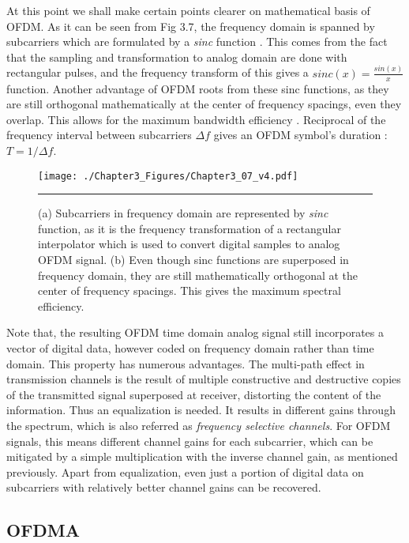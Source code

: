   
At this point we shall make certain points clearer on mathematical basis of OFDM. As it can be seen from Fig 3.7, the frequency domain is spanned by subcarriers which are formulated by a \textit{sinc} function \cite{CarlosOFDM}. This comes from the fact that the sampling and transformation to analog domain are done with rectangular pulses, and the frequency transform of this gives a $sinc(x) = \frac{sin(x)}{x}$ function. Another advantage of OFDM roots from these sinc functions, as they are still orthogonal mathematically at the center of frequency spacings, even they overlap. This allows for the maximum bandwidth efficiency \cite{debbah2004short}. Reciprocal of the frequency interval between subcarriers $\Delta f$ gives an OFDM symbol's duration : $T = 1/\Delta f$.


\begin{figure}[htbp]
  \centering
    \texttt{[image: ./Chapter3\_Figures/Chapter3\_07\_v4.pdf]}
    \rule{35em}{0.5pt}
  \caption[Subcarriers in frequency domain]{(a) Subcarriers in frequency domain are represented by \textit{sinc} function, as it is the frequency transformation of a rectangular interpolator which is used to convert digital samples to analog OFDM signal. (b) Even though sinc functions are superposed in frequency domain, they are still mathematically orthogonal at the center of frequency spacings. This gives the maximum spectral efficiency.}
  \label{fig:Electron}
\end{figure}



Note that, the resulting OFDM time domain analog signal still incorporates a vector of digital data, however coded on frequency domain rather than time domain. This property has numerous advantages. The multi-path effect in transmission channels is the result of multiple constructive and destructive copies of the transmitted signal superposed at receiver, distorting the content of the information. Thus an equalization is needed. It results in different gains through the spectrum, which is also referred as \textit{frequency selective channels}. For OFDM signals, this means different channel gains for each subcarrier, which can be mitigated by a simple multiplication with the inverse channel gain, as mentioned previously. Apart from equalization, even just a portion of digital data on subcarriers with relatively better channel gains can be recovered. 

\subsection{OFDMA}

